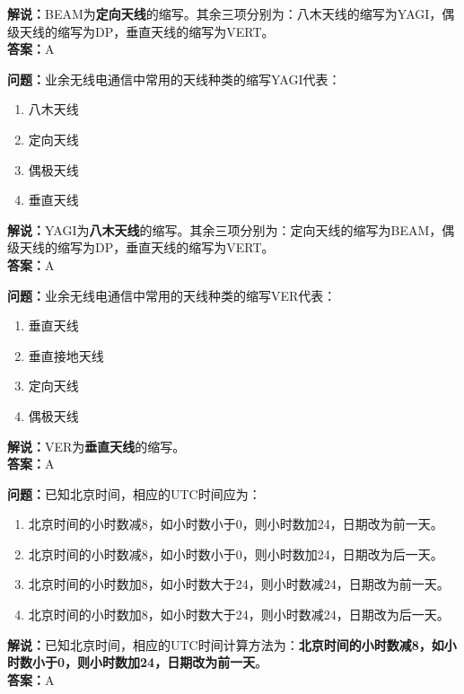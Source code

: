 \textbf{解说：}BEAM为\textbf{定向天线}的缩写。其余三项分别为：八木天线的缩写为YAGI，偶级天线的缩写为DP，垂直天线的缩写为VERT。\\\textbf{答案：}A



\textbf{问题：}业余无线电通信中常用的天线种类的缩写YAGI代表：

\begin{enumerate}[label=\Alph*), leftmargin=1.5cm]
	\item 八木天线
	\item 定向天线
	\item 偶极天线
	\item 垂直天线
\end{enumerate}

\textbf{解说：}YAGI为\textbf{八木天线}的缩写。其余三项分别为：定向天线的缩写为BEAM，偶级天线的缩写为DP，垂直天线的缩写为VERT。\\\textbf{答案：}A



\textbf{问题：}业余无线电通信中常用的天线种类的缩写VER代表：

\begin{enumerate}[label=\Alph*), leftmargin=1.5cm]
	\item 垂直天线
	\item 垂直接地天线
	\item 定向天线
	\item 偶极天线
\end{enumerate}

\textbf{解说：}VER为\textbf{垂直天线}的缩写。\\\textbf{答案：}A



\textbf{问题：}已知北京时间，相应的UTC时间应为：

\begin{enumerate}[label=\Alph*), leftmargin=1.5cm]
	\item 北京时间的小时数减8，如小时数小于0，则小时数加24，日期改为前一天。
	\item 北京时间的小时数减8，如小时数小于0，则小时数加24，日期改为后一天。
	\item 北京时间的小时数加8，如小时数大于24，则小时数减24，日期改为前一天。
	\item 北京时间的小时数加8，如小时数大于24，则小时数减24，日期改为后一天。
\end{enumerate}

\textbf{解说：}已知北京时间，相应的UTC时间计算方法为：\textbf{北京时间的小时数减8，如小时数小于0，则小时数加24，日期改为前一天}。\\\textbf{答案：}A



